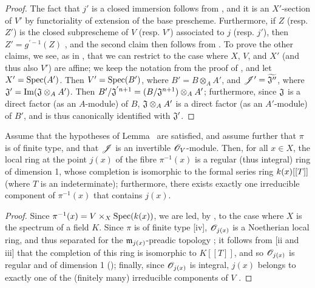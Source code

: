 \begin{proof}
\label{proof-2.8.10.2}
The fact that $j'$ is a closed immersion follows from , and it is an $X'$-section of $V'$ by functoriality of extension of the base prescheme.
Furthermore, if $Z$ (resp. $Z'$) is the closed subprescheme of $V$ (resp. $V'$) associated to $j$ (resp. $j'$), then $Z'=g^{'-1}(Z)$ , and the second claim then follows from .
To prove the other claims, we see, as in , that we can restrict to the case where $X$, $V$, and $X'$ (and thus also $V'$) are affine;
we keep the notation from the proof of , and let $X'=\operatorname{Spec}(A')$.
Then $V'=\operatorname{Spec}(B')$, where $B'=B\otimes_A A'$, and $\mathscr{J}'=\widetilde{\mathfrak{J}''}$, where $\mathfrak{J}'=\operatorname{Im}(\mathfrak{J}\otimes_A A')$.
Then $B'/\mathfrak{J}^{'n+1}=(B/\mathfrak{J}^{n+1})\otimes_A A'$;
furthermore, since $\mathfrak{J}$ is a direct factor (as an $A$-module) of $B$, $\mathfrak{J}\otimes_A A'$ is a direct factor (as an $A'$-module) of $B'$, and is thus canonically identified with $\mathfrak{J}'$.
\end{proof}

\begin{corollary}[8.10.3]
\label{II.8.10.3}
Assume that the hypotheses of Lemma~ are satisfied, and assume further that $\pi$ is of finite type, and that $\mathscr{J}$ is an invertible $\mathscr{O}_V$-module.
Then, for all $x\in X$, the local ring at the point $j(x)$ of the fibre $\pi^{-1}(x)$ is a regular (thus integral) ring of dimension 1, whose completion is isomorphic to the formal series ring $k(x)[[T]]$ (where $T$ is an indeterminate);
furthermore, there exists exactly one irreducible component of $\pi^{-1}(x)$ that contains $j(x)$.
\end{corollary}

\begin{proof}
\label{proof-2.8.10.3}
Since $\pi^{-1}(x)=V\times_X\operatorname{Spec}(k(x))$, we are led, by , to the case where $X$ is the spectrum of a field $K$.
Since $\pi$ is of finite type [iv], $\mathscr{O}_{j(x)}$ is a Noetherian local ring, and thus separated for the $\mathfrak{m}_{j(x)}$-preadic topology ;
it follows from [ii and iii] that the completion of this ring is isomorphic to $K[[T]]$, and so $\mathscr{O}_{j(x)}$ is regular and of dimension 1 (\cite[p.~17-01, th.~1]{I-1});
finally, since $\mathscr{O}_{j(x)}$ is integral, $j(x)$ belongs to exactly one of the (finitely many) irreducible components of $V$ .
\end{proof}

